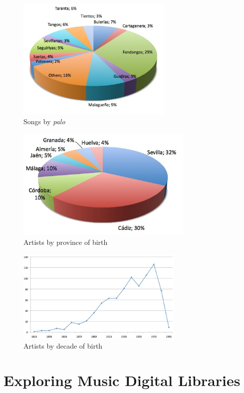 \begin{figure}[!ht]
    \centering
    \includegraphics[width=7.5cm]{ch05_musicology_pics/Songs-by-palo.jpg}
    \caption{Songs by \textit{palo} 
    \label{fig:musicology:graph-palo}}
\end{figure}


\begin{figure}[!ht]
	\centering
	\includegraphics[width=8.5cm]{ch05_musicology_pics/Artists-by-province.jpg}
	\caption{Artists by province of birth 
	\label{fig:musicology:graph-province}}
\end{figure}


\begin{figure}[!ht]
	\centering
	\includegraphics[width=8cm]{ch05_musicology_pics/Artists-by-decade-of-birth.jpg}
	\caption{Artists by decade of birth 
	\label{fig:musicology:graph-decade}}
\end{figure}


\section{Exploring Music Digital Libraries}

